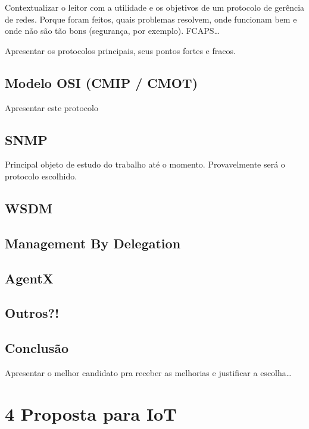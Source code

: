 \documentclass[twoside,english,brazilian]{UNISINOSmonografia}
\begin{document}
	Contextualizar o leitor com a utilidade e os objetivos de um protocolo
	de gerência de redes. Porque foram feitos, quais problemas resolvem,
	onde funcionam bem e onde não são tão bons (segurança, por exemplo).
	FCAPS\ldots
	
	Apresentar os protocolos principais, seus pontos fortes e fracos.
	
	
	
	\section{Modelo OSI (CMIP / CMOT)}

		Apresentar este protocolo
		
		
		
	\section{SNMP}

		Principal objeto de estudo do trabalho até o momento.
		Provavelmente será o protocolo escolhido.
		
		
	
	\section{WSDM}
	
	
	\section{Management By Delegation}
	
	
	\section{AgentX}
	
	
	\section{Outros?!}
	
	
	\section{Conclusão}
	
		Apresentar o melhor candidato pra receber as melhorias e justificar
		a escolha\ldots



\chapter{4 Proposta para IoT}
\end{document}
